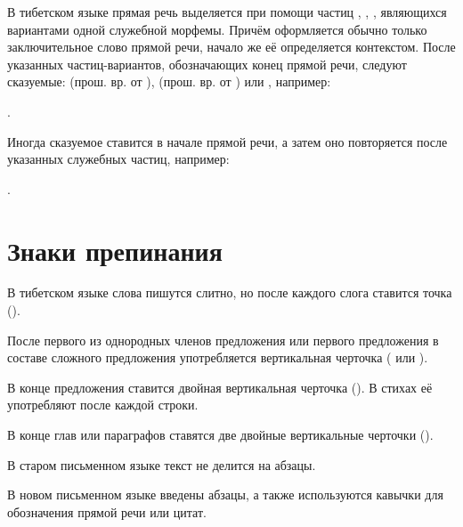 В тибетском языке прямая речь выделяется при помощи частиц	, , , являющихся вариантами одной служебной морфемы. Причём оформляется обычно только заключительное слово прямой речи, начало же её определяется контекстом. После указанных частиц-вариантов, обозначающих конец прямой речи, следуют сказуемые:
 (прош. вр. от ),
 (прош. вр. от ) или
, например:
\begin{prfsample}
	\item {}.
\end{prfsample}

Иногда сказуемое  ставится в начале прямой речи, а затем оно повторяется после указанных служебных частиц, например:
\begin{prfsample}
	\item {}.
\end{prfsample}

\section{Знаки препинания}

В тибетском языке слова пишутся слитно, но после каждого слога ставится точка ().

После первого из однородных членов предложения или первого предложения в составе сложного предложения употребляется вертикальная черточка ( или
).

В конце предложения ставится двойная вертикальная черточка (). В стихах её употребляют после каждой строки.

В конце глав или параграфов ставятся две двойные вертикальные черточки ().

В старом письменном языке текст не делится на абзацы.

В новом письменном языке введены абзацы, а также используются кавычки для обозначения прямой речи или цитат.
